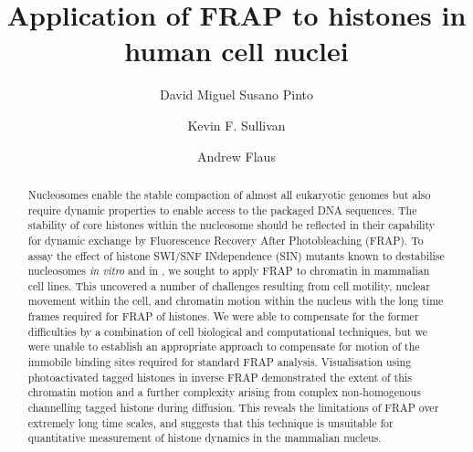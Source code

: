 \documentclass[a4paper,oneside,onecolumn,article,draft]{memoir}
\author{David Miguel Susano Pinto \and Kevin F. Sullivan \and Andrew Flaus}
\title{Application of FRAP to histones in human cell nuclei}
\begin{document}
  \maketitle

  \begin{abstract}
    Nucleosomes enable the stable compaction of almost all eukaryotic
    genomes but also require dynamic properties to enable access to
    the packaged DNA sequences.  The stability of core histones within the
    nucleosome should be reflected in their capability for dynamic exchange by
    Fluorescence Recovery After Photobleaching (FRAP).  To assay the
    effect of histone SWI/SNF INdependence (SIN)
    mutants known to destabilise nucleosomes
    \textit{in vitro} and in , we sought to
    apply FRAP to chromatin in mammalian cell lines.  This uncovered a
    number of challenges resulting from cell motility, nuclear movement
    within the cell, and chromatin motion within the nucleus with the
    long time frames required for FRAP of histones.  We were able to
    compensate for the former difficulties by a combination of cell
    biological and computational techniques, but we were unable to
    establish an appropriate approach to compensate for motion of the immobile
    binding sites required for standard FRAP analysis.
    Visualisation using photoactivated tagged histones in inverse FRAP
    demonstrated the extent of this chromatin motion
    and a further complexity arising from complex
    non-homogenous channelling tagged histone
    during diffusion.  This reveals the
    limitations of FRAP over extremely long time scales, and suggests
    that this technique is unsuitable for quantitative measurement of
    histone dynamics in the mammalian nucleus.
  \end{abstract}

  
  
  
  
  
\end{document}
